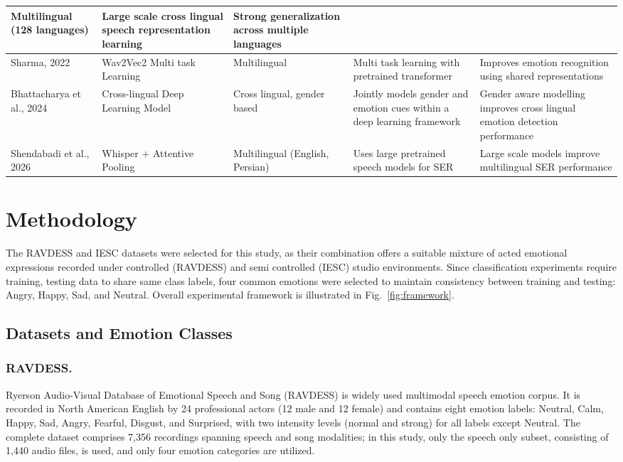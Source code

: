 \documentclass[runningheads]{llncs}
\begin{document}
\begin{table}[htbp]
{\begin{tabular}{|p{2.0cm}|p{3.2cm}|p{2.6cm}|p{4.2cm}|p{4.2cm}|}
Multilingual (128 languages) &
Large scale cross lingual speech representation learning &
Strong generalization across multiple languages \\
\hline
Sharma, 2022 \cite{b17} &
Wav2Vec2 Multi task Learning &
Multilingual &
Multi task learning with pretrained transformer &
Improves emotion recognition using shared representations \\
\hline
Bhattacharya et al., 2024 \cite{b22} &
Cross-lingual Deep Learning Model &
Cross lingual, gender based &
Jointly models gender and emotion cues within a deep learning framework &
Gender aware modelling improves cross lingual emotion detection performance \\
\hline
Shendabadi et al., 2026 \cite{b28} &
Whisper + Attentive Pooling &
Multilingual (English, Persian) &
Uses large pretrained speech models for SER &
Large scale models improve multilingual SER performance \\
\hline
\end{tabular}%
}
\end{table}


\section{Methodology}
\label{sec:methodology}

The RAVDESS and IESC datasets were selected for this study, as their combination offers a suitable mixture of acted emotional expressions recorded under controlled (RAVDESS) and semi controlled (IESC) studio environments. Since classification experiments require training, testing data to share same class labels, four common emotions were selected to maintain consistency between training and testing: Angry, Happy, Sad, and Neutral.  Overall experimental framework is illustrated in Fig.~\ref{fig:framework}.

\subsection{Datasets and Emotion Classes}

\subsubsection{RAVDESS.}
 Ryerson Audio-Visual Database of Emotional Speech and Song (RAVDESS) is widely used multimodal speech emotion corpus. It is recorded in North American English by 24 professional actors (12 male and 12 female) and contains eight emotion labels: Neutral, Calm, Happy, Sad, Angry, Fearful, Disgust, and Surprised, with two intensity levels (normal and strong) for all labels except Neutral. The complete dataset comprises 7,356 recordings spanning speech and song modalities; in this study, only the speech only subset, consisting of 1,440 audio files, is used, and only four emotion categories are utilized.
\end{document}

